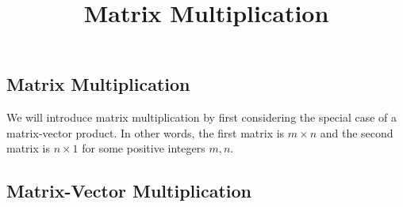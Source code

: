 \documentclass{ximera}
\title{Matrix Multiplication} \license{CC BY-NC-SA 4.0}
\begin{document}
\begin{abstract}

\end{abstract}
\maketitle

\begin{onlineOnly}
\section*{Matrix Multiplication}
\end{onlineOnly}

We will introduce matrix multiplication by first considering the special case of a matrix-vector product.  In other words, the first matrix is $m \times n$ and the second matrix is $n \times 1$ for some positive integers $m,n$. %

\subsection*{Matrix-Vector Multiplication}
\end{document}
